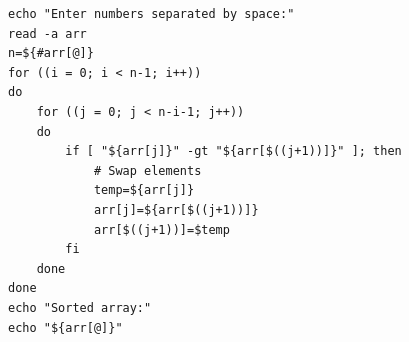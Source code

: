 \begin{verbatim}
echo "Enter numbers separated by space:"
read -a arr
n=${#arr[@]}
for ((i = 0; i < n-1; i++))
do
    for ((j = 0; j < n-i-1; j++))
    do
        if [ "${arr[j]}" -gt "${arr[$((j+1))]}" ]; then
            # Swap elements
            temp=${arr[j]}
            arr[j]=${arr[$((j+1))]}
            arr[$((j+1))]=$temp
        fi
    done
done
echo "Sorted array:"
echo "${arr[@]}"
\end{verbatim}